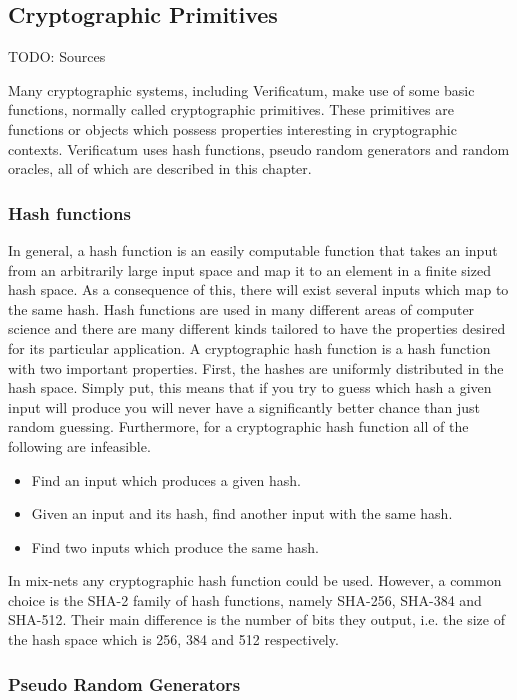 \subsection{Cryptographic Primitives}

TODO: Sources

Many cryptographic systems, including Verificatum, make use of some
basic functions, normally called cryptographic primitives. These
primitives are functions or objects which possess properties
interesting in cryptographic contexts. Verificatum uses hash
functions, pseudo random generators and random oracles, all of which
are described in this chapter.

\subsubsection{Hash functions}
In general, a hash function is an easily computable function that
takes an input from an arbitrarily large input space and map it to an
element in a finite sized hash space. As a consequence of this, there
will exist several inputs which map to the same hash. Hash functions
are used in many different areas of computer science and there are
many different kinds tailored to have the properties desired for its
particular application. A cryptographic hash function is a hash
function with two important properties. First, the hashes are
uniformly distributed in the hash space. Simply put, this means that
if you try to guess which hash a given input will produce you will
never have a significantly better chance than just random
guessing. Furthermore, for a cryptographic hash function all of the
following are infeasible.

\begin{itemize}
\item Find an input which produces a given hash.
\item Given an input and its hash, find another input with the same hash.
\item Find two inputs which produce the same hash.
\end{itemize}

In mix-nets any cryptographic hash function could be used. However, a
common choice is the SHA-2 family of hash functions, namely SHA-256,
SHA-384 and SHA-512. Their main difference is the number of bits they
output, i.e. the size of the hash space which is 256, 384 and 512
respectively.

\subsubsection{Pseudo Random Generators}

